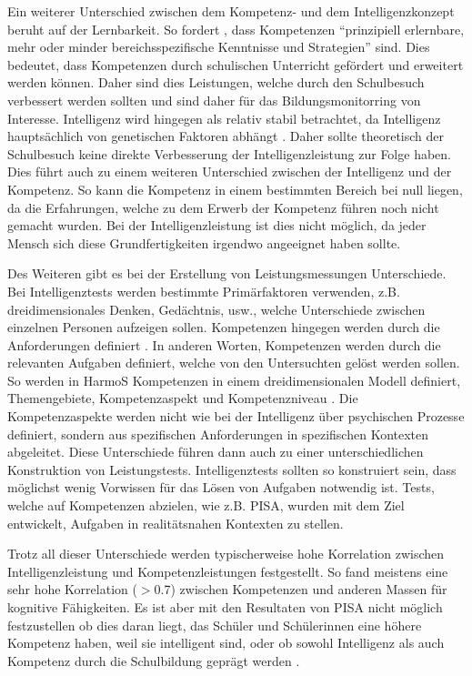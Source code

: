 Ein weiterer Unterschied zwischen dem Kompetenz- und dem Intelligenzkonzept beruht auf der Lernbarkeit. So fordert \citet[S. 22]{Baumert2001}, dass Kompetenzen "`prinzipiell erlernbare, mehr oder minder bereichsspezifische Kenntnisse und Strategien"' sind. Dies bedeutet, dass Kompetenzen durch schulischen Unterricht gefördert und erweitert werden können. Daher sind dies Leistungen, welche durch den Schulbesuch verbessert werden sollten und sind daher für das Bildungsmonitorring von Interesse. Intelligenz wird hingegen als relativ stabil betrachtet, da Intelligenz hauptsächlich von genetischen Faktoren abhängt \citep{Shakeshaft2013}. Daher sollte theoretisch der Schulbesuch keine direkte Verbesserung der Intelligenzleistung zur Folge haben. Dies führt auch zu einem weiteren Unterschied zwischen der Intelligenz und der Kompetenz. So kann die Kompetenz in einem bestimmten Bereich bei null liegen, da die Erfahrungen, welche zu dem Erwerb der Kompetenz führen noch nicht gemacht wurden. Bei der Intelligenzleistung ist dies nicht möglich, da jeder Mensch sich diese Grundfertigkeiten irgendwo angeeignet haben sollte.


Des Weiteren gibt es bei der Erstellung von Leistungsmessungen Unterschiede. Bei Intelligenztests werden bestimmte Primärfaktoren verwenden, z.B. dreidimensionales Denken, Gedächtnis, usw., welche Unterschiede zwischen einzelnen Personen aufzeigen sollen. Kompetenzen hingegen werden durch die Anforderungen definiert \citep{Rychen}. In anderen Worten, Kompetenzen werden durch die relevanten Aufgaben definiert, welche von den Untersuchten gelöst werden sollen. So werden in HarmoS Kompetenzen in einem dreidimensionalen Modell definiert, Themengebiete, Kompetenzaspekt und Kompetenzniveau \citep{KonsotriumHarmoSNaturwissenschaften+2010}. Die Kompetenzaspekte werden nicht wie bei der Intelligenz über psychischen Prozesse definiert, sondern aus spezifischen Anforderungen in spezifischen Kontexten abgeleitet. Diese Unterschiede führen dann auch zu einer unterschiedlichen Konstruktion von Leistungstests. Intelligenztests sollten so konstruiert sein, dass möglichst wenig Vorwissen für das Lösen von Aufgaben notwendig ist. Tests, welche auf Kompetenzen abzielen, wie z.B. PISA, wurden mit dem Ziel entwickelt, Aufgaben in realitätsnahen  Kontexten zu stellen. 

Trotz all dieser Unterschiede werden typischerweise hohe Korrelation zwischen Intelligenzleistung und Kompetenzleistungen festgestellt. So fand \citet{Rindermann2006} meistens eine sehr hohe Korrelation ($ > $0.7) zwischen Kompetenzen und anderen Massen für kognitive Fähigkeiten. Es ist aber mit den Resultaten von PISA nicht möglich festzustellen ob dies daran liegt, das Schüler und Schülerinnen eine höhere Kompetenz haben, weil sie intelligent sind, oder ob sowohl Intelligenz als auch Kompetenz durch die Schulbildung geprägt werden \citep{Hartig2006}.



